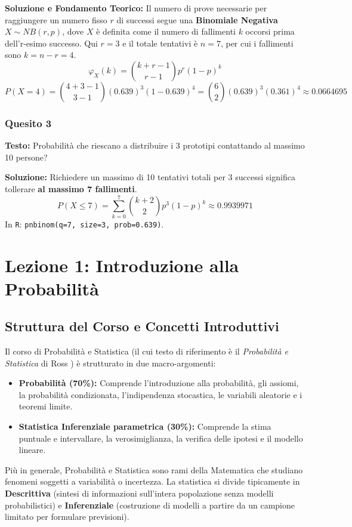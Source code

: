 \documentclass[12pt, a4paper]{article}
\begin{document}
\textbf{Soluzione e Fondamento Teorico:} 
Il numero di prove necessarie per raggiungere un numero fisso $r$ di successi segue una \textbf{Binomiale Negativa} $X \sim NB(r, p)$, dove $X$ è definita come il numero di fallimenti $k$ occorsi prima dell'r-esimo successo.
Qui $r = 3$ e il totale tentativi è $n = 7$, per cui i fallimenti sono $k = n - r = 4$.
$$ \varphi_X(k) = \binom{k+r-1}{r-1} p^r (1-p)^k $$
$$ P(X=4) = \binom{4+3-1}{3-1} (0.639)^3 (1 - 0.639)^4 = \binom{6}{2} (0.639)^3 (0.361)^4 \approx 0.0664695 $$

\subsubsection*{Quesito 3}
\textbf{Testo:} Probabilità che riescano a distribuire i 3 prototipi contattando al massimo 10 persone?

\textbf{Soluzione:}
Richiedere un massimo di 10 tentativi totali per 3 successi significa tollerare \textbf{al massimo 7 fallimenti}.
$$ P(X \le 7) = \sum_{k=0}^{7} \binom{k+2}{2} p^3 (1-p)^k \approx 0.9939971 $$
In \texttt{R}: \texttt{pnbinom(q=7, size=3, prob=0.639)}.


\section{Lezione 1: Introduzione alla Probabilità}

\subsection{Struttura del Corso e Concetti Introduttivi}
Il corso di Probabilità e Statistica (il cui testo di riferimento è il \textit{Probabilità e Statistica} di Ross ) è strutturato in due macro-argomenti:
\begin{itemize}
    \item \textbf{Probabilità (70\%):} Comprende l'introduzione alla probabilità, gli assiomi, la probabilità condizionata, l'indipendenza stocastica, le variabili aleatorie e i teoremi limite.
    \item \textbf{Statistica Inferenziale parametrica (30\%):} Comprende la stima puntuale e intervallare, la verosimiglianza, la verifica delle ipotesi e il modello lineare.
\end{itemize}

Più in generale, Probabilità e Statistica sono rami della Matematica che studiano fenomeni soggetti a variabilità o incertezza. La statistica si divide tipicamente in \textbf{Descrittiva} (sintesi di informazioni sull'intera popolazione senza modelli probabilistici) e \textbf{Inferenziale} (costruzione di modelli a partire da un campione limitato per formulare previsioni).
\end{document}
